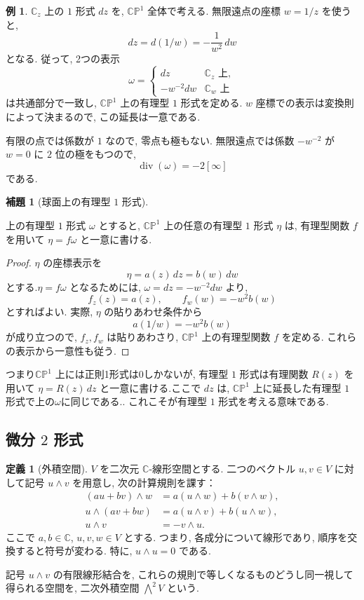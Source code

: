 \documentclass[dvipdfmx,a4paper,11pt]{article} %
\newcommand{\C}{\mathbb{C}}
\theoremstyle{definition}
\numberwithin{equation}{section}
\newtheorem{lem}[thm]{補題}
\newtheorem{dfn}[thm]{定義}
\newtheorem{exa}[thm]{例}
\begin{document}
\begin{exa}\label{O-M094}
$\C_z$ 上の $1$ 形式 $dz$ を, $\C\mathbb P^1$ 全体で考える.
無限遠点の座標 $w=1/z$ を使うと, 
\[
dz=d(1/w)=-\frac1{w^2}\,dw
\]
となる.
従って, 2つの表示
\[
\omega=
\begin{cases}
dz & \C_z\text{ 上},\\
-w^{-2}dw & \C_w\text{ 上}
\end{cases}
\]
は共通部分で一致し, $\C\mathbb P^1$ 上の有理型 $1$ 形式を定める.
$w$ 座標での表示は変換則によって決まるので, この延長は一意である.

有限の点では係数が $1$ なので, 零点も極もない.
無限遠点では係数 $-w^{-2}$ が $w=0$ に $2$ 位の極をもつので, 
\[
\operatorname{div}(\omega)=-2[\infty]
\]
である.
\end{exa}

\begin{lem}[球面上の有理型 $1$ 形式]\label{lem-meromorphic-forms-sphere}

上の有理型 $1$ 形式 $\omega$ とすると, 
$\C\mathbb P^1$ 上の任意の有理型 $1$ 形式 $\eta$ は, 
有理型関数 $f$ を用いて $\eta=f\omega$ と一意に書ける.

\end{lem}
\begin{proof}
 $\eta$ の座標表示を
\[
\eta=a(z)\,dz=b(w)\,dw
\]
とする.$\eta=f\omega$ となるためには, 
$\omega=dz=-w^{-2}dw$ より, 
\[
f_z(z)=a(z),\qquad f_w(w)=-w^2b(w)
\]
とすればよい.
実際, $\eta$ の貼りあわせ条件から
\[
a(1/w)=-w^2b(w)
\]
が成り立つので, $f_z,f_w$ は貼りあわさり, 
$\C\mathbb P^1$ 上の有理型関数 $f$ を定める.
これらの表示から一意性も従う.
\end{proof}

つまり$\C\mathbb P^1$ 上には正則1形式は0しかないが, 有理型 $1$ 形式は有理関数 $R(z)$ を用いて
\(
\eta=R(z)\,dz
\)
と一意に書ける.ここで $dz$ は, $\C\mathbb P^1$ 上に延長した有理型 $1$ 形式で上の$\omega$に同じである..
これこそが有理型 $1$ 形式を考える意味である. 





\subsection{微分 $2$ 形式}\label{O-S020}
\begin{dfn}[外積空間]\label{O-M096}
$V$ を二次元 $\C$-線形空間とする.
二つのベクトル $u,v\in V$ に対して記号 $u\wedge v$ を用意し,
次の計算規則を課す：
\[
\begin{aligned}
(au+bv)\wedge w&=a(u\wedge w)+b(v\wedge w),\\
u\wedge(av+bw)&=a(u\wedge v)+b(u\wedge w),\\
u\wedge v&=-v\wedge u.
\end{aligned}
\]
ここで $a,b\in\C$, $u,v,w\in V$ とする.
つまり, 各成分について線形であり,
順序を交換すると符号が変わる.
特に, $u\wedge u=0$ である.

記号 $u\wedge v$ の有限線形結合を,
これらの規則で等しくなるものどうし同一視して得られる空間を,
二次外積空間 $\bigwedge^2V$ という.
\end{dfn}
\end{document}
